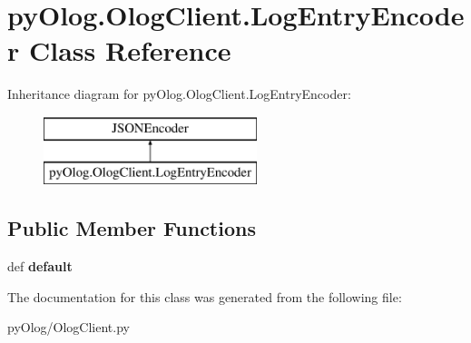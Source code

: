 \hypertarget{classpyOlog_1_1OlogClient_1_1LogEntryEncoder}{\section{py\-Olog.\-Olog\-Client.\-Log\-Entry\-Encoder Class Reference}
\label{classpyOlog_1_1OlogClient_1_1LogEntryEncoder}
}
Inheritance diagram for py\-Olog.\-Olog\-Client.\-Log\-Entry\-Encoder\-:\begin{figure}[H]
\begin{center}
\leavevmode
\includegraphics[height=2.000000cm]{classpyOlog_1_1OlogClient_1_1LogEntryEncoder}
\end{center}
\end{figure}
\subsection*{Public Member Functions}
\begin{DoxyCompactItemize}
\item 
\hypertarget{classpyOlog_1_1OlogClient_1_1LogEntryEncoder_a0b7bfb3de48985148b6b53a020b53f98}{def {\bfseries default}}\label{classpyOlog_1_1OlogClient_1_1LogEntryEncoder_a0b7bfb3de48985148b6b53a020b53f98}

\end{DoxyCompactItemize}


The documentation for this class was generated from the following file\-:\begin{DoxyCompactItemize}
\item 
py\-Olog/Olog\-Client.\-py\end{DoxyCompactItemize}
